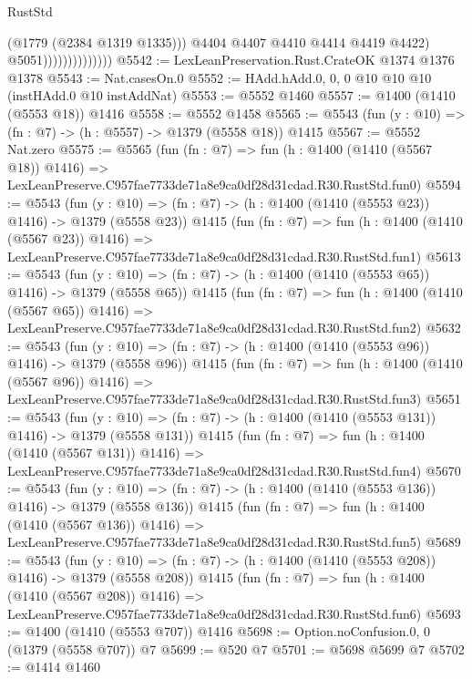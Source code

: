 \begin{lexlean}{RustStd}
\begin{coremodule}
                                    (@1779 (@2384 @1319 @1335)))
                                  @4404
                                  @4407
                                  @4410
                                  @4414
                                  @4419
                                  @4422)
                                @5051))))))))))))))
@5542 := LexLeanPreservation.Rust.CrateOK @1374 @1376 @1378
@5543 := Nat.casesOn.{0}
@5552 := HAdd.hAdd.{0, 0, 0} @10 @10 @10 (instHAdd.{0} @10 instAddNat)
@5553 := @5552 @1460
@5557 := @1400 (@1410 (@5553 @18)) @1416
@5558 := @5552 @1458
@5565 := @5543 (fun (y : @10) => (fn : @7) -> (h : @5557) -> @1379 (@5558 @18)) @1415
@5567 := @5552 Nat.zero
@5575 := @5565
    (fun (fn : @7) =>
    fun (h : @1400 (@1410 (@5567 @18)) @1416) =>
    LexLeanPreserve.C957fae7733de71a8e9ca0df28d31cdad.R30.RustStd.fun0)
@5594 := @5543
    (fun (y : @10) => (fn : @7) -> (h : @1400 (@1410 (@5553 @23)) @1416) -> @1379 (@5558 @23))
    @1415
    (fun (fn : @7) =>
    fun (h : @1400 (@1410 (@5567 @23)) @1416) =>
    LexLeanPreserve.C957fae7733de71a8e9ca0df28d31cdad.R30.RustStd.fun1)
@5613 := @5543
    (fun (y : @10) => (fn : @7) -> (h : @1400 (@1410 (@5553 @65)) @1416) -> @1379 (@5558 @65))
    @1415
    (fun (fn : @7) =>
    fun (h : @1400 (@1410 (@5567 @65)) @1416) =>
    LexLeanPreserve.C957fae7733de71a8e9ca0df28d31cdad.R30.RustStd.fun2)
@5632 := @5543
    (fun (y : @10) => (fn : @7) -> (h : @1400 (@1410 (@5553 @96)) @1416) -> @1379 (@5558 @96))
    @1415
    (fun (fn : @7) =>
    fun (h : @1400 (@1410 (@5567 @96)) @1416) =>
    LexLeanPreserve.C957fae7733de71a8e9ca0df28d31cdad.R30.RustStd.fun3)
@5651 := @5543
    (fun (y : @10) => (fn : @7) -> (h : @1400 (@1410 (@5553 @131)) @1416) -> @1379 (@5558 @131))
    @1415
    (fun (fn : @7) =>
    fun (h : @1400 (@1410 (@5567 @131)) @1416) =>
    LexLeanPreserve.C957fae7733de71a8e9ca0df28d31cdad.R30.RustStd.fun4)
@5670 := @5543
    (fun (y : @10) => (fn : @7) -> (h : @1400 (@1410 (@5553 @136)) @1416) -> @1379 (@5558 @136))
    @1415
    (fun (fn : @7) =>
    fun (h : @1400 (@1410 (@5567 @136)) @1416) =>
    LexLeanPreserve.C957fae7733de71a8e9ca0df28d31cdad.R30.RustStd.fun5)
@5689 := @5543
    (fun (y : @10) => (fn : @7) -> (h : @1400 (@1410 (@5553 @208)) @1416) -> @1379 (@5558 @208))
    @1415
    (fun (fn : @7) =>
    fun (h : @1400 (@1410 (@5567 @208)) @1416) =>
    LexLeanPreserve.C957fae7733de71a8e9ca0df28d31cdad.R30.RustStd.fun6)
@5693 := @1400 (@1410 (@5553 @707)) @1416
@5698 := Option.noConfusion.{0, 0} (@1379 (@5558 @707)) @7
@5699 := @520 @7
@5701 := @5698 @5699 @7
@5702 := @1414 @1460

\end{coremodule}
\end{lexlean}

